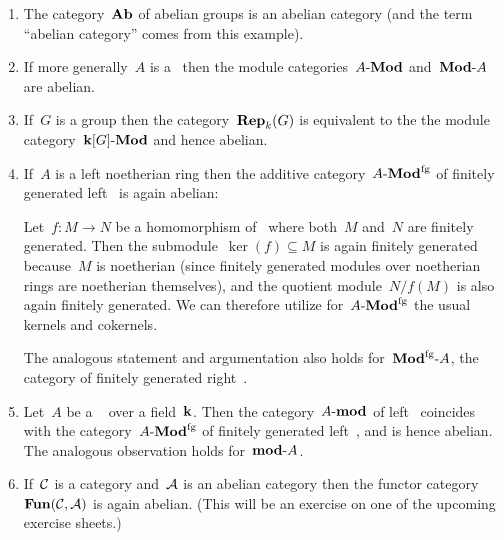 \begin{example}
  \leavevmode
  \begin{enumerate}
    \item
      The category~$\mathbf{Ab}$ of abelian groups is an abelian category (and the term \enquote{abelian category} comes from this example).
    \item
      If more generally~$A$ is a~{\kalg} then the module categories~$\text{$A$-$\mathbf{Mod}$}$ and~$\text{$\mathbf{Mod}$-$A$}$ are abelian.
    \item
      If~$G$ is a group then the category~$\mathbf{Rep}_{k}(G)$ is equivalent to the the module category~$\text{$\mathbf{k}[G]$-$\mathbf{Mod}$}$ and hence abelian.
    \item
      If~$A$ is a left noetherian ring then the additive category~$\text{$A$-$\mathbf{Mod}^{\mathrm{fg}}$}$ of finitely generated left~{} is again abelian:
      
      Let~$f \colon M \to N$ be a homomorphism of~{} where both~$M$ and~$N$ are finitely generated.
      Then the submodule~$\ker(f) \subseteq M$ is again finitely generated because~$M$ is noetherian (since finitely generated modules over noetherian rings are noetherian themselves), and the quotient module~$N/f(M)$ is also again finitely generated.
      We can therefore utilize for~$\text{$A$-$\mathbf{Mod}^{\mathrm{fg}}$}$ the usual kernels and cokernels.
      
      The analogous statement and argumentation also holds for~$\text{$\mathbf{Mod}^{\mathrm{fg}}$-$A$}$, the category of finitely generated right~{}.
    \item
      Let~$A$ be a {\fd}~{\kalg} over a field~$\mathbf{k}$.
      Then the category~$\text{$A$-$\mathbf{mod}$}$ of {\fd} left~{} coincides with the category~$\text{$A$-$\mathbf{Mod}^{\mathrm{fg}}$}$ of finitely generated left~{}, and is hence abelian.
      The analogous observation holds for~$\text{$\mathbf{mod}$-$A$}$.
    \item
      If~$\mathcal{C}$ is a category and~$\mathcal{A}$ is an abelian category then the functor category~$\mathbf{Fun}(\mathcal{C}, \mathcal{A})$ is again abelian.
      (This will be an exercise on one of the upcoming exercise sheets.)
  \end{enumerate}
\end{example}


